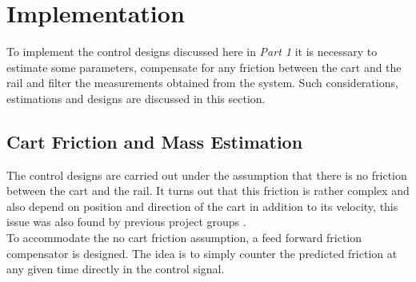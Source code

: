%
\chapter{Implementation}
To implement the control designs discussed here in \textit{Part 1} it is necessary to estimate some parameters, compensate for any friction between the cart and the rail and filter the measurements obtained from the system. Such considerations, estimations and designs are discussed in this section.

\section{Cart Friction and Mass Estimation}
The control designs are carried out under the assumption that there is no friction between the cart and the rail. It turns out that this friction is rather complex and also depend on position and direction of the cart in addition to its velocity, this issue was also found by previous project groups \cite{JHHorgensen}.\\
To accommodate the no cart friction assumption, a feed forward friction compensator is designed. The idea is to simply counter the predicted friction at any given time directly in the control signal.

